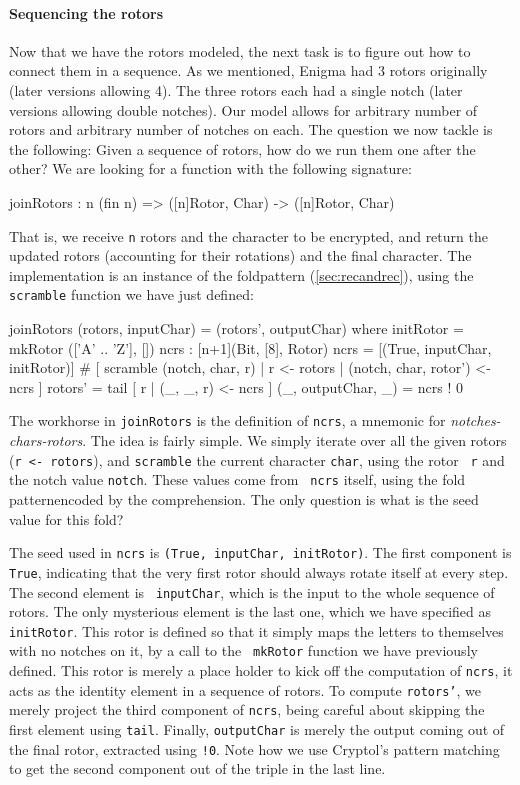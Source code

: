\paragraph*{Sequencing the rotors} Now that we have the rotors modeled,
the next task is to figure out how to connect them in a sequence. As
we mentioned, Enigma had 3 rotors originally (later versions allowing
4). The three rotors each had a single notch (later versions allowing
double notches).  Our model allows for arbitrary number of rotors and
arbitrary number of notches on each.  The question we now tackle is
the following: Given a sequence of rotors, how do we run them one
after the other? We are looking for a function with the following
signature:
\begin{code}
  joinRotors : {n} (fin n) => ([n]Rotor, Char) -> ([n]Rotor, Char)
\end{code}
That is, we receive {\tt n} rotors and the character to be encrypted,
and return the updated rotors (accounting for their rotations) and the
final character.  The implementation is an instance of the
fold\indFold pattern (\autoref{sec:recandrec}), using the {\tt
  scramble} function we have just defined:
\begin{code}
  joinRotors (rotors, inputChar) = (rotors', outputChar)
    where 
      initRotor = mkRotor (['A' .. 'Z'], [])
      ncrs : [n+1](Bit, [8], Rotor)
      ncrs = [(True, inputChar, initRotor)]
                # [  scramble (notch, char, r)
                     | r <- rotors
                     | (notch, char, rotor') <- ncrs
                  ]
      rotors' = tail [ r | (_, _, r) <- ncrs ]
      (_, outputChar, _) = ncrs ! 0
\end{code}
The workhorse in {\tt joinRotors} is the definition of {\tt ncrs}, a
mnemonic for {\em notches-chars-rotors}. The idea is fairly simple.
We simply iterate over all the given rotors ({\tt r <- rotors}), and
{\tt scramble} the current character {\tt char}, using the rotor {\tt
  r} and the notch value {\tt notch}.  These values come from {\tt
  ncrs} itself, using the fold pattern\indFold encoded by the
comprehension\indComp.  The only question is what is the seed value
for this fold? 

The seed used in {\tt ncrs} is {\tt (True, inputChar, initRotor)}. The
first component is {\tt True}, indicating that the very first rotor
should always rotate itself at every step. The second element is {\tt
  inputChar}, which is the input to the whole sequence of rotors. The
only mysterious element is the last one, which we have specified as
{\tt initRotor}.  This rotor is defined so that it simply maps the
letters to themselves with no notches on it, by a call to the {\tt
  mkRotor} function we have previously defined. This rotor is merely a
place holder to kick off the computation of {\tt ncrs}, it acts as the
identity element in a sequence of rotors.  To compute {\tt rotors'},
we merely project the third component of {\tt ncrs}, being careful
about skipping the first element using {\tt tail}\indTail.  Finally,
{\tt outputChar} is merely the output coming out of the final rotor,
extracted using {\tt !0}\indRIndex. Note how we use Cryptol's pattern
matching to get the second component out of the triple in the last
line.\indPatMatch

